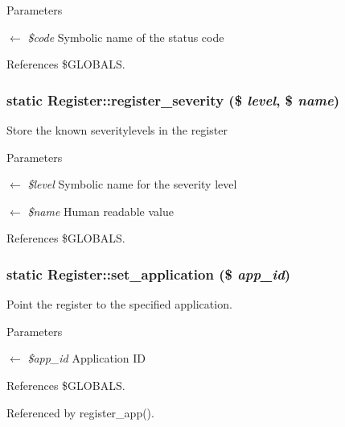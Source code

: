 \begin{DoxyParams}{Parameters}
\item[\mbox{$\leftarrow$} {\em \$code}]Symbolic name of the status code \end{DoxyParams}


References \$GLOBALS.

\subsubsection[{register\_\-severity}]{\setlength{\rightskip}{0pt plus 5cm}static Register::register\_\-severity (\$ {\em level}, \/  \$ {\em name})}\label{classRegister_ac22a104eefa471675cb28ee20821eaad}
Store the known severitylevels in the register


\begin{DoxyParams}{Parameters}
\item[\mbox{$\leftarrow$} {\em \$level}]Symbolic name for the severity level \item[\mbox{$\leftarrow$} {\em \$name}]Human readable value \end{DoxyParams}


References \$GLOBALS.

\subsubsection[{set\_\-application}]{\setlength{\rightskip}{0pt plus 5cm}static Register::set\_\-application (\$ {\em app\_\-id})}\label{classRegister_ad4d61787414f7d64d1e3420f0fdf3f91}
Point the register to the specified application.


\begin{DoxyParams}{Parameters}
\item[\mbox{$\leftarrow$} {\em \$app\_\-id}]Application ID \end{DoxyParams}


References \$GLOBALS.



Referenced by register\_\-app().

